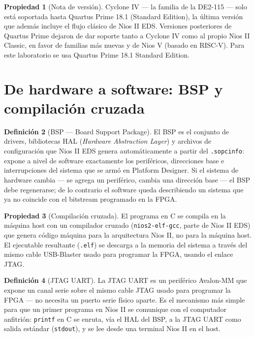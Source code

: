 \documentclass[11pt,letterpaper]{article}
\theoremstyle{definition}
\newtheorem{definicion}{Definición}[section]
\newtheorem{propiedad}[definicion]{Propiedad}
\begin{document}
\begin{propiedad}[Nota de versión]
Cyclone IV --- la familia de la DE2-115 --- solo está soportada hasta Quartus Prime 18.1 (Standard
Edition), la última versión que además incluye el flujo clásico de Nios II EDS. Versiones
posteriores de Quartus Prime dejaron de dar soporte tanto a Cyclone IV como al propio Nios II
Classic, en favor de familias más nuevas y de Nios V (basado en RISC-V). Para este laboratorio se
usa Quartus Prime 18.1 Standard Edition.
\end{propiedad}

\section{De hardware a software: BSP y compilación cruzada}

\begin{definicion}[BSP --- Board Support Package]
El BSP es el conjunto de drivers, bibliotecas HAL (\emph{Hardware Abstraction Layer}) y archivos de
configuración que Nios II EDS genera automáticamente a partir del \texttt{.sopcinfo}: expone a nivel
de software exactamente los periféricos, direcciones base e interrupciones del sistema que se armó
en Platform Designer. Si el sistema de hardware cambia --- se agrega un periférico, cambia una
dirección base --- el BSP debe regenerarse; de lo contrario el software queda describiendo un
sistema que ya no coincide con el bitstream programado en la FPGA.
\end{definicion}

\begin{propiedad}[Compilación cruzada]
El programa en C se compila en la máquina host con un compilador cruzado (\texttt{nios2-elf-gcc},
parte de Nios II EDS) que genera código máquina para la arquitectura Nios II, no para la máquina
host. El ejecutable resultante (\texttt{.elf}) se descarga a la memoria del sistema a través del
mismo cable USB-Blaster usado para programar la FPGA, usando el enlace JTAG.
\end{propiedad}

\begin{definicion}[JTAG UART]
La JTAG UART es un periférico Avalon-MM que expone un canal serie sobre el mismo cable JTAG usado
para programar la FPGA --- no necesita un puerto serie físico aparte. Es el mecanismo más simple
para que un primer programa en Nios II se comunique con el computador anfitrión: \texttt{printf} en
C se enruta, vía el HAL del BSP, a la JTAG UART como salida estándar (\texttt{stdout}), y se lee
desde una terminal Nios II en el host.
\end{definicion}
\end{document}
